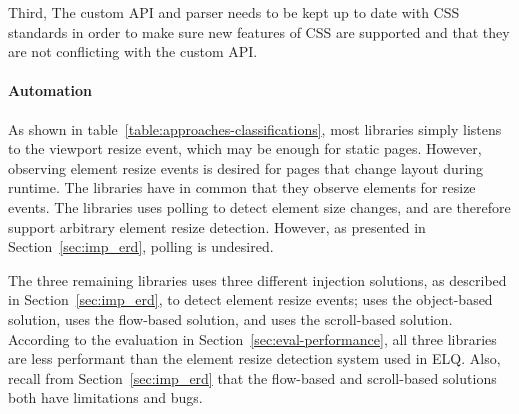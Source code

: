 \documentclass[a4paper,11pt]{kth-mag}
\begin{document}
    Third, The custom \gls{API} and parser needs to be kept up to date with \gls{CSS} standards in order to make sure new features of \gls{CSS} are supported and that they are not conflicting with the custom \gls{API}.

    \paragraph{Automation}
    As shown in table~\ref{table:approaches-classifications}, most libraries simply listens to the \gls{viewport} resize event, which may be enough for static pages.
    However, observing element resize events is desired for pages that change layout during runtime.
    The libraries \cite{eq_imp_localised-css,eq_imp_selector_queries,eq_imp_prollyfill-min-width,eq_imp_gss,eq_imp_element-queries,eq_imp_css-element-queries} have in common that they observe \glspl{element} for resize events.
    The libraries \cite{eq_imp_localised-css,eq_imp_selector_queries} uses polling to detect element size changes, and are therefore support arbitrary element resize detection.
    However, as presented in Section~\ref{sec:imp_erd}, polling is undesired.

    The three remaining libraries uses three different injection solutions, as described in Section~\ref{sec:imp_erd}, to detect element resize events; \cite{eq_imp_element-queries} uses the object-based solution, \cite{eq_imp_prollyfill-min-width} uses the flow-based solution, and \cite{eq_imp_css-element-queries} uses the scroll-based solution.
    According to the evaluation in Section~\ref{sec:eval-performance}, all three libraries are less performant than the element resize detection system used in \gls{ELQ}.
    Also, recall from Section~\ref{sec:imp_erd} that the flow-based and scroll-based solutions both have limitations and bugs.
\end{document}
